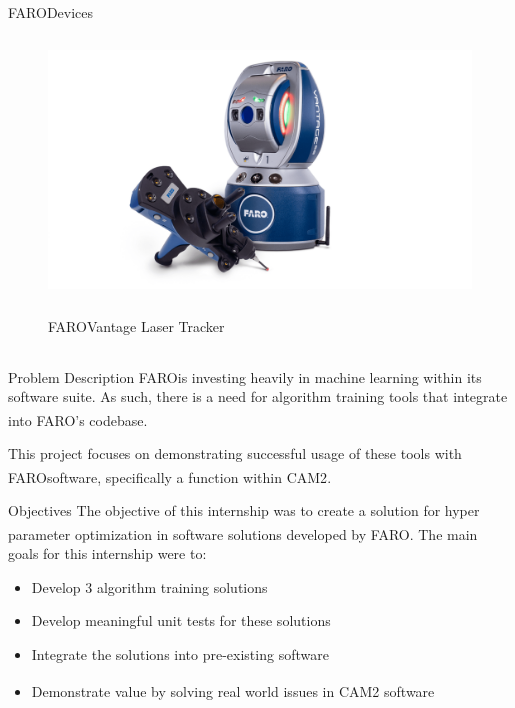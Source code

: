 \documentclass[10pt]{beamer}
\newcommand{\faro}[0]{FARO\textsuperscript{\textregistered}}
\begin{document}
\begin{frame}{\faro Devices}
\begin{columns}
\begin{column}{0.35\textwidth}
\begin{figure}
          \centering
          \includegraphics[width=\textwidth]{images/faro-probe.png}
          \caption{\\\faro Vantage Laser Tracker}
        \end{figure}
      \end{column}
    \end{columns}
  \end{frame}

  \begin{frame}{Problem Description}
    \faro is investing heavily  in machine learning within its software suite. As such, there is a need for algorithm training tools that integrate into \faro's codebase.

    This project focuses on demonstrating successful usage of these tools with \faro software, specifically a function within CAM2\textsuperscript{\textregistered}. 
  \end{frame}

  \begin{frame}{Objectives}
    The objective of this internship was to create a solution for hyper parameter optimization in software solutions developed by \faro. The main goals for this internship were to:
    \begin{itemize}
      \item Develop 3 algorithm training solutions
      \item Develop meaningful unit tests for these solutions
      \item Integrate the solutions into pre-existing software
      \item Demonstrate value by solving real world issues in CAM2\textsuperscript{\textregistered} software
    \end{itemize}
  \end{frame}
\end{document}
